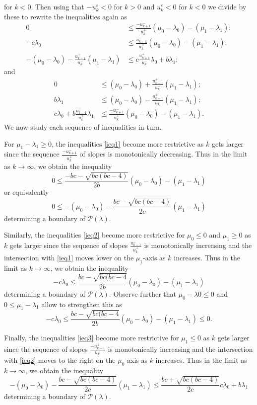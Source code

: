 \documentclass{amsart}
\numberwithin{theorem}{section}
\newcommand{\cP}{\mathcal{P}}
\begin{document}
  for $k<0$.
  Then using that $-u_k^\varepsilon<0$ for $k>0$ and $u_k^\varepsilon<0$ for $k<0$ we divide by these to rewrite the inequalities again as
  \begin{align}
    \label{ieq1} 0 & \le \frac{-u_{k+1}^-}{u_k^+}(\mu_0-\lambda_0)-(\mu_1-\lambda_1);\\
    \label{ieq2} -c\lambda_0 & \le \frac{u_{k-1}^-}{u_k^+}(\mu_0-\lambda_0)-(\mu_1-\lambda_1);\\
    \label{ieq3} -(\mu_0-\lambda_0)-\frac{u_{k-1}^+}{u_k^-}(\mu_1-\lambda_1) &\le c\frac{u_{k+1}^+}{u_k^-}\lambda_0+b\lambda_1;
  \end{align}
  and
  \begin{align}
    \label{ieq4} 0 &\le (\mu_0-\lambda_0)+\frac{u_{k-1}^+}{u_k^-}(\mu_1-\lambda_1);\\
    \label{ieq5} b\lambda_1 &\le (\mu_0-\lambda_0)-\frac{u_{k+1}^+}{u_k^-}(\mu_1-\lambda_1);\\
    \label{ieq6} c\lambda_0+b\frac{u_{k-1}^-}{u_k^+}\lambda_1 &\le \frac{-u_{k+1}^-}{u_k^+}(\mu_0-\lambda_0)-(\mu_1-\lambda_1).
  \end{align}
  We now study each sequence of inequalities in turn.

  For $\mu_1-\lambda_1\ge 0$, the inequalities \eqref{ieq1} become more restrictive as $k$ gets larger since the sequence $\frac{-u_{k+1}^-}{u_k^+}$ of slopes is monotonically decreasing.
  Thus in the limit as $k\to\infty$, we obtain the inequality 
  \[ 0 \le \frac{-bc-\sqrt{bc(bc-4)}}{2b}(\mu_0-\lambda_0)-(\mu_1-\lambda_1) \]
  or equivalently
  \[ 0 \le -(\mu_0-\lambda_0)-\frac{bc-\sqrt{bc(bc-4)}}{2c}(\mu_1-\lambda_1) \]
  determining a boundary of $\cP(\lambda)$.

  Similarly, the inequalities \eqref{ieq2} become more restrictive for $\mu_0\le0$ and $\mu_1\ge0$ as $k$ gets larger since the sequence of slopes $\frac{u_{k-1}^-}{u_k^+}$ is monotonically increasing and the intersection with \eqref{ieq1} moves lower on the $\mu_1$-axis as $k$ increases.
  Thus in the limit as $k\to\infty$, we obtain the inequality
  \[ -c\lambda_0 \le \frac{bc-\sqrt{bc(bc-4}}{2b}(\mu_0-\lambda_0)-(\mu_1-\lambda_1) \]
  determining a boundary of $\cP(\lambda)$.
  Observe further that $\mu_0-\lambda0 \le 0$ and $0 \le \mu_1-\lambda_1$ allow to strengthen this as
  \[ -c\lambda_0 \le \frac{bc-\sqrt{bc(bc-4}}{2b}(\mu_0-\lambda_0)-(\mu_1-\lambda_1) \le 0. \]

  Finally, the inequalities \eqref{ieq3} become more restrictive for $\mu_1\le0$ as $k$ gets larger since the sequence of slopes $\frac{-u_{k-1}^+}{u_k^-}$ is monotonically increasing and the intersection with \eqref{ieq2} moves to the right on the $\mu_0$-axis as $k$ increases.
  Thus in the limit as $k\to\infty$, we obtain the inequality
  \[ -(\mu_0-\lambda_0)-\frac{bc-\sqrt{bc(bc-4)}}{2c}(\mu_1-\lambda_1) \le \frac{bc+\sqrt{bc(bc-4)}}{2c}c\lambda_0+b\lambda_1 \]
  determining a boundary of $\cP(\lambda)$.
\end{document}
